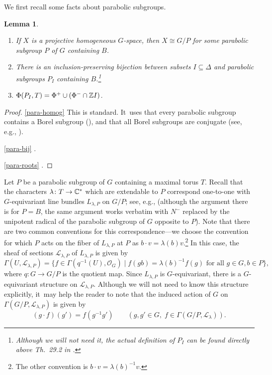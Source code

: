 \documentclass[11pt]{article}
\newcommand{\skpt}{\smallskip}
\newenvironment{enumeratea}
{\bgroup\def\theenumi{\alph{enumi}}
\begin{enumerate}}
{\end{enumerate}\egroup}
\newtheorem{lem}[thm]{Lemma}
\begin{document}
\pagebreak[2]
We first recall some facts about parabolic subgroups.

\skpt
\begin{lem}\label{para-facts}
\begin{enumeratea}
\item\label{para-homog} If $X$ is a projective homogeneous $G$-space, then $X\cong G/P$ for some parabolic subgroup $P$ of $G$ containing $B$.

\item\label{para-bij} There is an inclusion-preserving bijection between subsets $I\subseteq \Delta$ and parabolic subgroups $P_I$ containing $B$.\footnote{Although we will not need it, the actual definition of $P_I$ can be found directly above Th.~29.2 in \cite{Hum75}.}
\item\label{para-roots} $\Phi(P_I, T) = \Phi^+\cup (\Phi^-\cap {\mathbb Z} I)$.
\end{enumeratea}
\end{lem}

\skpt
\begin{proof}
\eqref{para-homog} This is standard. It~uses that every parabolic subgroup contains a Borel subgroup (\cite[Cor.\,21.3.B.]{Hum75}), and that all Borel subgroups are conjugate (see, e.g., \cite[Th.\,21.3]{Hum75}).

\eqref{para-bij} \cite[Th.\,29.3]{Hum75}.

\eqref{para-roots} \cite[Th.\,30.1]{Hum75}.
\end{proof}

Let $P$ be a parabolic subgroup of $G$ containing a maximal torus $T$. Recall that the characters $\lambda\colon T\to {\mathbb C}^*$ which are extendable to $P$ correspond one-to-one with $G$-equivariant line bundles $L_{\lambda,P}$ on $G/P$; see, e.g., \cite[\S9.11]{Hotta} (although the argument there is for $P=B$, the same argument works verbatim with $N^{-}$ replaced by the unipotent radical of the parabolic subgroup of $G$ opposite to $P$). Note that there are two common conventions for this correspondence---we choose the convention for which $P$ acts on the fiber of $L_{\lambda,P}$ at $P$ as $b\cdot v = \lambda(b)v$.\footnote{The other convention is $b\cdot v = \lambda(b)^{-1}v$.} In this case, the sheaf of sections $\mathscr{L}_{\lambda,P}$ of $L_{\lambda,P}$ is given by
\begin{equation}\label{eq:borel-L-lambda}
\Gamma(U, \mathscr{L}_{\lambda,P}) = \{f\in \Gamma(q^{-1}(U), \mathscr{O}_G) \mid f(gb) = \lambda(b)^{-1}f(g)\text{ for all }g\in G, b\in P\},
\end{equation}
where $q\colon G\to G/P$ is the quotient map. Since $L_{\lambda,P}$ is $G$-equivariant, there is a $G$-equivariant structure on $\mathscr{L}_{\lambda,P}$. Although we will not need to know this structure explicitly, it~may help the reader to note that the induced action of $G$ on $\Gamma(G/P, \mathscr{L}_{\lambda,P})$ is given by
\begin{equation*}
(g\cdot f)(g') = f(g^{-1}g')\qquad (g,g'\in G,\; f\in \Gamma(G/P, \mathscr{L}_\lambda)).
\end{equation*}
\end{document}
